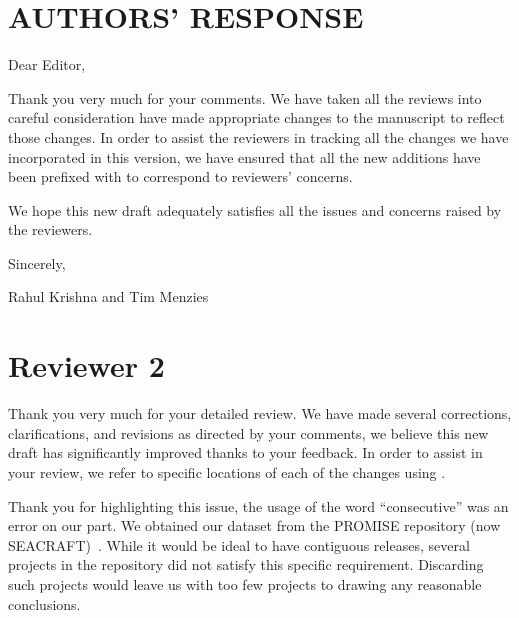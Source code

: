 \pagebreak
\newpage
\section*{\textbf{AUTHORS' RESPONSE}}

\renewcommand*{\thesection}{\Alph{section}}
\nobalance

\noindent Dear Editor, 

Thank you very much for your comments. We have taken all the reviews into careful consideration have made appropriate changes to the manuscript to reflect those changes. In order to assist  the  reviewers  in  tracking  all the  changes we have incorporated in this version, we have ensured that all the new additions have been prefixed with  to correspond to reviewers' concerns.

We hope this new draft adequately satisfies all the issues and concerns raised by the reviewers.

\noindent Sincerely,\hfill

\vspace{10pt}

\noindent Rahul Krishna and Tim Menzies


\section*{Reviewer 2}
Thank you very much for your detailed review. We have made several 
corrections, clarifications, and revisions as directed by your comments, we believe this new draft has significantly improved thanks to your feedback. In order to assist in your review, we refer to specific locations of each of the changes using .


Thank you for highlighting this issue, the usage of the word \enquote{consecutive} was an error on our part. We obtained our dataset from the PROMISE repository (now SEACRAFT)~\citep{Jureczko2010}. While it would be ideal to have contiguous releases, several projects in the repository did not satisfy this specific requirement. Discarding such projects would leave us with too few projects to drawing any reasonable conclusions. 

